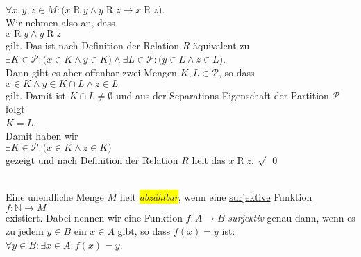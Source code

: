 \begin{enumerate}
      \\[0.2cm]
      \hspace*{1.3cm}
      $\forall x,y,z \in M:\bigl( x \mathop{R} y \wedge y \mathop{R} z \rightarrow x \mathop{R} z\bigr)$.
      \\[0.2cm]
      Wir nehmen also an, dass 
      \\[0.2cm]
      \hspace*{1.3cm}
      $x \mathop{R} y \wedge y \mathop{R} z$
      \\[0.2cm]
      gilt.  Das ist nach Definition der Relation $R$ \"{a}quivalent zu
      \\[0.2cm]
      \hspace*{1.3cm}
      $\exists K \in \mathcal{P}: \bigl(x \in K \wedge y \in K\bigr) \wedge 
       \exists L \in \mathcal{P}: \bigl(y \in L \wedge z \in L\bigr)$.
      \\[0.2cm]
      Dann gibt es aber offenbar zwei Mengen $K,L\in\mathcal{P}$, so dass
      \\[0.2cm]
      \hspace*{1.3cm}
      $x \in K \wedge y \in K \cap L \wedge z \in L$
      \\[0.2cm]
      gilt.  Damit ist $K \cap L \not= \emptyset$ und aus der 
      Separations-Eigenschaft der Partition $\mathcal{P}$ folgt 
      \\[0.2cm]
      \hspace*{1.3cm}
      $K = L$.
      \\[0.2cm]
      Damit haben wir 
      \\[0.2cm]
      \hspace*{1.3cm}
      $\exists K \in \mathcal{P}: \bigl(x \in K \wedge z \in K\bigr)$
      \\[0.2cm]
      gezeigt und nach Definition der Relation $R$ hei\3t das 
      $x \mathop{R} z$. $\surd$
      \qed
\end{enumerate}


\begin{Definition} \hspace*{\fill} \\
Eine unendliche Menge $M$ hei\3t \colorbox{yellow}{\emph{abz\"{a}hlbar}}, wenn eine 
\underline{sur}j\underline{ektive} Funktion
\\[0.2cm]
\hspace*{1.3cm}
$f: \mathbb{N} \rightarrow M$
\\[0.2cm]
existiert.  Dabei nennen wir eine Funktion $f:A \rightarrow B$  \emph{surjektiv} genau
dann, wenn es zu jedem $y \in B$ ein $x \in A$ gibt, so dass $f(x) = y$ ist:
\\[0.2cm]
\hspace*{1.3cm}
$\forall y \in B: \exists x \in A: f(x) = y$.  \eox
\end{Definition}

